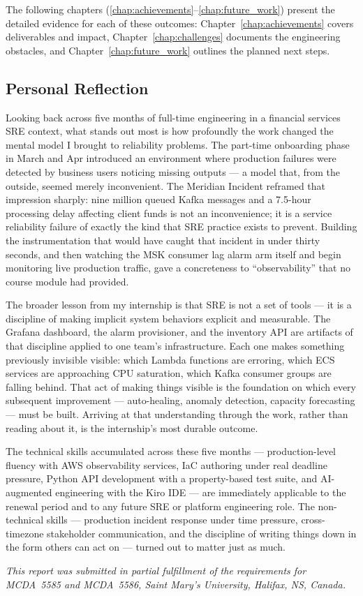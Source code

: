 The following chapters (\ref{chap:achievements}--\ref{chap:future_work}) present the detailed evidence for each of these outcomes: Chapter~\ref{chap:achievements} covers deliverables and impact, Chapter~\ref{chap:challenges} documents the engineering obstacles, and Chapter~\ref{chap:future_work} outlines the planned next steps.

\subsection{Personal Reflection}

Looking back across five months of full-time engineering in a financial services
SRE context, what stands out most is how profoundly the work changed the mental
model I brought to reliability problems. The part-time onboarding phase in March
and Apr introduced an environment where production failures were detected by
business users noticing missing outputs --- a model that, from the outside, seemed
merely inconvenient. The Meridian Incident reframed that impression sharply:
nine million queued Kafka messages and a 7.5-hour processing delay affecting
client funds is not an inconvenience; it is a service reliability failure of
exactly the kind that SRE practice exists to prevent. Building the instrumentation
that would have caught that incident in under thirty seconds, and then watching
the MSK consumer lag alarm arm itself and begin monitoring live production
traffic, gave a concreteness to ``observability'' that no course module had
provided.

The broader lesson from my internship is that SRE is not a set of tools --- it is
a discipline of making implicit system behaviors explicit and measurable. The
Grafana dashboard, the alarm provisioner, and the inventory API are artifacts of
that discipline applied to one team's infrastructure. Each one makes something
previously invisible visible: which Lambda functions are erroring, which ECS
services are approaching CPU saturation, which Kafka consumer groups are falling
behind. That act of making things visible is the foundation on which every
subsequent improvement --- auto-healing, anomaly detection, capacity forecasting ---
must be built. Arriving at that understanding through the work, rather than reading
about it, is the internship's most durable outcome.

The technical skills accumulated across these five months --- production-level
fluency with AWS observability services, IaC authoring under real deadline
pressure, Python API development with a property-based test suite, and
AI-augmented engineering with the Kiro IDE --- are immediately applicable to
the renewal period and to any future SRE or platform engineering role. The
non-technical skills --- production incident response under time pressure,
cross-timezone stakeholder communication, and the discipline of writing things
down in the form others can act on --- turned out to matter just as much.

\vspace{1em}
\noindent
\textit{This report was submitted in partial fulfillment of the requirements
for MCDA~5585 and MCDA~5586, Saint Mary's University, Halifax, NS, Canada.}
